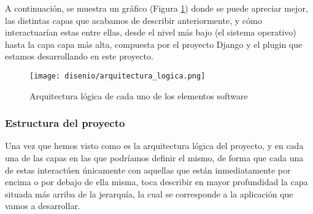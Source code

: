 A continuación, se muestra un gráfico (Figura \ref{fig:ArquitecturaLogica})
donde se puede apreciar mejor, las distintas capas que acabamos de describir
anteriormente, y cómo interactuarían estas entre ellas, desde el nivel más bajo
(el sistema operativo) hasta la capa capa más alta, compuesta por el proyecto
Django y el plugin que estamos desarrollando en este proyecto.

\begin{figure}[H]
    \begin{center}
        \texttt{[image: disenio/arquitectura\_logica.png]}
    \end{center}
    \caption{Arquitectura lógica de cada uno de los elementos software}
    \label{fig:ArquitecturaLogica}
\end{figure}

\subsubsection{Estructura del proyecto}

Una vez que hemos visto como es la arquitectura lógica del proyecto, y en cada
una de las capas en las que podríamos definir el mismo, de forma que cada una de
estas interactúen únicamente con aquellas que están inmediatamente por encima o
por debajo de ella misma, toca describir en mayor profundidad la capa situada
más arriba de la jerarquía, la cual se corresponde a la aplicación que vamos a
desarrollar.

